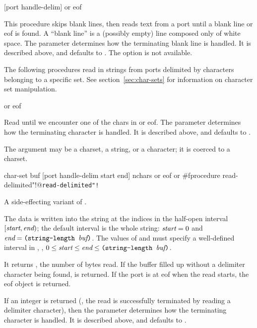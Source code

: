 {[port handle-delim]} {{\str} or eof}
\begin{desc}
    This procedure skips blank lines,
    then reads text from a port until a blank line or eof is found.
    A ``blank line'' is a (possibly empty) line composed only of white space.
    The  parameter determines how the terminating
    blank line is handled.
    It is described above, and defaults to .
    The  option is not available.
\end{desc}


The following procedures read in strings from ports delimited by characters
belonging to a specific set.
See section~\ref{sec:char-sets} for information on character set manipulation.

 {{\str} or eof}
\begin{desc}
    Read until we encounter one of the chars in  or eof.
    The  parameter determines how the terminating character
    is handled. It is described above, and defaults to .

    The  argument may be a charset, a string, or a
    character; it is coerced to a charset.
\end{desc}

 {char-set buf [port handle-delim start end]}
        {nchars or eof or \#f}{procedure}
        {read-delimited"!@\texttt{read-delimited"!}}
\begin{desc}
    A side-effecting variant of .
    
    The data is written into the string  at the indices in the
    half-open interval $[\var{start},\var{end})$; the default interval is the
    whole string: $\var{start}=0$ and $\var{end}=\ex{(string-length
    \var{buf})}$.  The values of  and  must specify a
    well-defined interval in , \ie, $0 \le \var{start} \le \var{end}
    \le \ex{(string-length \var{buf})}$.  

    It returns , the number of bytes read. If the buffer filled up
    without a delimiter character being found,  is returned. If
    the port is at eof when the read starts, the eof object is returned.

    If an integer is returned (\ie, the read is successfully terminated by
    reading a delimiter character), then the  parameter
    determines how the terminating character is handled. 
    It is described above, and defaults to .
\end{desc}



